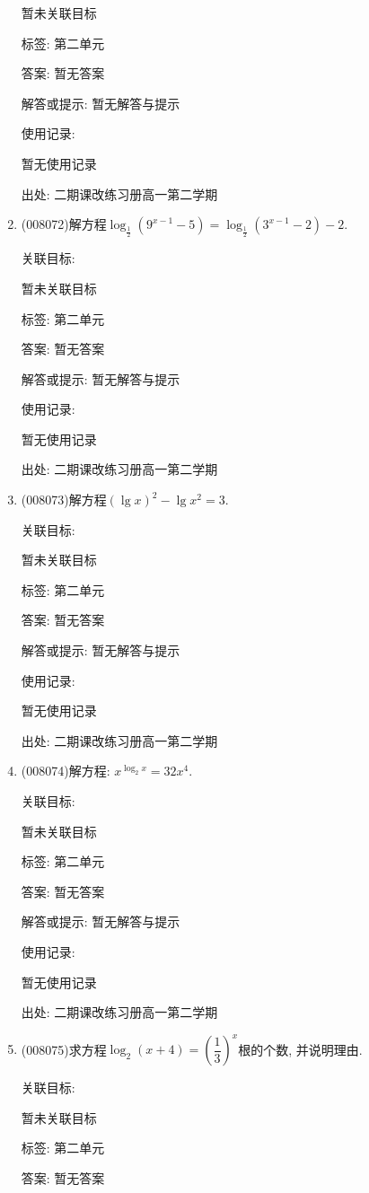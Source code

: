 \documentclass[10pt,a4paper]{article}
\begin{document}
\begin{enumerate}[1.]
暂未关联目标



标签: 第二单元

答案: 暂无答案

解答或提示: 暂无解答与提示

使用记录:

暂无使用记录


出处: 二期课改练习册高一第二学期
\item { (008072)}解方程$\log _{\frac 12}(9^{x-1}-5)=\log _{\frac 12}(3^{x-1}-2)-2$.


关联目标:

暂未关联目标



标签: 第二单元

答案: 暂无答案

解答或提示: 暂无解答与提示

使用记录:

暂无使用记录


出处: 二期课改练习册高一第二学期
\item { (008073)}解方程$(\lg x)^2-\lg x^2=3$.


关联目标:

暂未关联目标



标签: 第二单元

答案: 暂无答案

解答或提示: 暂无解答与提示

使用记录:

暂无使用记录


出处: 二期课改练习册高一第二学期
\item { (008074)}解方程: $x^{\log _2x}=32x^4$.


关联目标:

暂未关联目标



标签: 第二单元

答案: 暂无答案

解答或提示: 暂无解答与提示

使用记录:

暂无使用记录


出处: 二期课改练习册高一第二学期
\item { (008075)}求方程$\log _2(x+4)=(\dfrac 13)^x$根的个数, 并说明理由.


关联目标:

暂未关联目标



标签: 第二单元

答案: 暂无答案


\end{enumerate}
\end{document}
